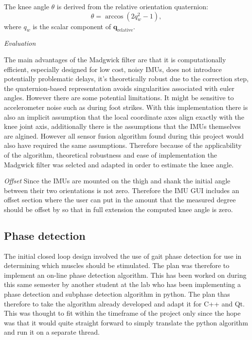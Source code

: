 The knee angle \( \theta \) is derived from the relative orientation quaternion:
\[
\theta = \arccos{\left( 2q_w^2 - 1 \right)},
\]
where \( q_w \) is the scalar component of \( \mathbf{q}_{\text{relative}} \).

\textit{Evaluation}

The main advantages of the Madgwick filter are that it is computationally efficient, especially designed for low cost, noisy IMUs, does not introduce potentially problematic delays, it's theoretically robust due to the correction step, the quaternion-based representation avoids singularities associated with euler angles. However there are some potential limitations. It might be sensitive to accelerometer noise such as during foot strikes. With this implementation there is also an implicit assumption that the local coordinate axes align exactly with the knee joint axis, additionally there is the assumptions that the IMUs themselves are algined. However all sensor fusion algorithm found during this project would also have required the same assumptions. Therefore because of the applicability of the algorithm, theoretical robustness and ease of implementation the Madgwick filter was selcted and adapted in order to estimate the knee angle.
\newline

\textit{Offset}
Since the IMUs are mounted on the thigh and shank the initial angle between their two orientations is not zero. Therefore the IMU GUI includes an offset section where the user can put in the amount that the measured degree should be offset by so that in full extension the computed knee angle is zero.


\subsection{Phase detection}

The initial closed loop design involved the use of gait phase detection for use in determining which muscles should be stimulated. The plan was therefore to implement an on-line phase detection algorithm. This has been worked on during this same semester by another student at the lab who has been implementing a phase detection and subphase detection algorithm in python. The plan thas therefore to take the algorithm already developed and adapt it for C++ and Qt. This was thought to fit within the timeframe of the project only since the hope was that it would quite straight forward to simply translate the python algorithm and run it on a separate thread.

